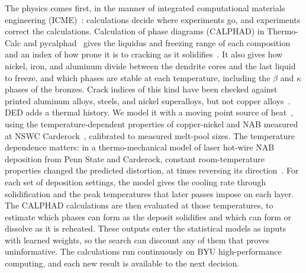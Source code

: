 \documentclass[12pt,letterpaper]{article}
\begin{document}
The physics comes first, in the manner of integrated computational materials
engineering (ICME)~\cite{olson1997,nrc2008}: calculations decide where
experiments go, and experiments correct the calculations. Calculation of
phase diagrams (CALPHAD) in Thermo-Calc and pycalphad~\cite{andersson2002,otis2017}
gives the liquidus and freezing range of each composition and an index of how
prone it is to cracking as it solidifies~\cite{kou2015}. It also gives how
nickel, iron, and aluminum divide between the dendrite cores and the last
liquid to freeze, and which phases are stable at each temperature, including
the $\beta$ and $\kappa$ phases of the bronzes. Crack indices of this kind
have been checked against printed aluminum alloys, steels, and nickel
superalloys, but not copper alloys~\cite{jordan2026}.
DED adds a thermal history.
We model it with a moving point source of heat~\cite{rosenthal1946,pinkerton2015}, using the temperature-dependent properties of copper-nickel and NAB measured at NSWC Carderock~\cite{norkett2025,norkett2026a,norkett2026b,orzolek2023}, calibrated to measured melt-pool sizes.
The temperature dependence matters: in a thermo-mechanical model of laser hot-wire NAB deposition from Penn State and Carderock, constant room-temperature properties changed the predicted distortion, at times reversing its direction~\cite{hatala2021}.
For each set of deposition settings, the model gives the cooling rate through solidification and the peak temperatures that later passes impose on each layer.
The CALPHAD
calculations are then evaluated at those temperatures, to estimate which
phases can form as the deposit solidifies and which can form or dissolve as
it is reheated. These outputs enter the statistical models as inputs with
learned weights, so the search can discount any of them that proves
uninformative. The calculations run continuously on BYU high-performance
computing, and each new result is available to the next decision.
\end{document}

